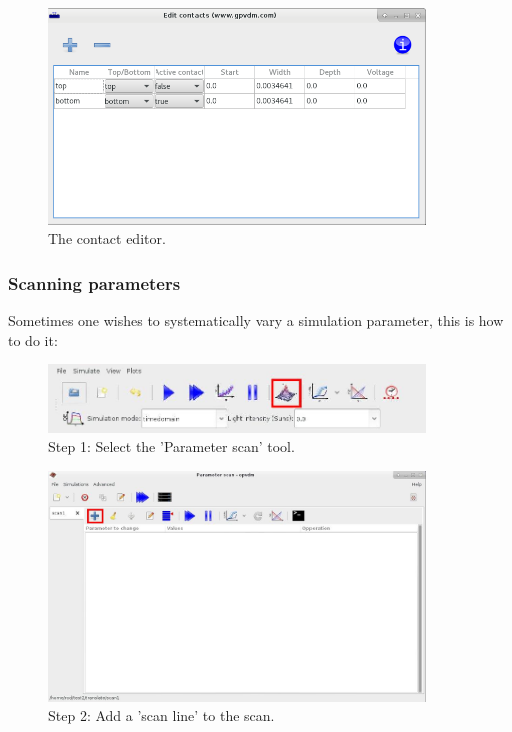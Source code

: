 \documentclass[11pt]{article}
\begin{document}
\begin{figure}[ht!]
\centering
\includegraphics[width=100mm]{./images/contact_editor.png}
{\caption{The contact editor.}}
\label{fig:contact_editor}
\end{figure}



\subsubsection{Scanning parameters}
Sometimes one wishes to systematically vary a simulation parameter, this is how to do it:




\begin{figure}[ht!]
\centering
\includegraphics[width=100mm]{./images/1.jpg}
{\caption*{Step 1: Select the 'Parameter scan' tool.}}
\label{overflow}
\end{figure}


\begin{figure}[ht!]
\centering
\includegraphics[width=100mm]{./images/2.jpg}
\caption*{Step 2: Add a 'scan line' to the scan.}
\end{figure}
\end{document}
